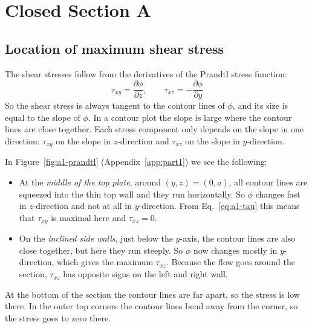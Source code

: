 \chapter{Closed Section A}
\label{ch:assignment1}

\bigskip

\section{Location of maximum shear stress}
\label{sec:a1-1}
The shear stresses follow from the derivatives of the Prandtl stress function:
\begin{equation}
    \tau_{xy} = \frac{\partial\phi}{\partial z},
    \qquad
    \tau_{xz} = -\frac{\partial\phi}{\partial y}
    \label{eq:a1-tau}
\end{equation}
So the shear stress is always tangent to the contour lines of $\phi$, and its size is equal to the slope of $\phi$. In a contour plot the slope is large where the contour lines are close together. Each stress component only depends on the slope in one direction: $\tau_{xy}$ on the slope in $z$-direction and $\tau_{xz}$ on the slope in $y$-direction.

In Figure~\ref{fig:a1-prandtl} (Appendix~\ref{app:part1}) we see the following:
\begin{itemize}
    \item At the \emph{middle of the top plate}, around $(y,z)=(0,a)$, all contour lines are squeezed into the thin top wall and they run horizontally. So $\phi$ changes fast in $z$-direction and not at all in $y$-direction. From Eq.~\eqref{eq:a1-tau} this means that $\tau_{xy}$ is maximal here and $\tau_{xz}=0$.
    \item On the \emph{inclined side walls}, just below the $y$-axis, the contour lines are also close together, but here they run steeply. So $\phi$ now changes mostly in $y$-direction, which gives the maximum $\tau_{xz}$. Because the flow goes around the section, $\tau_{xz}$ has opposite signs on the left and right wall.
\end{itemize}
At the bottom of the section the contour lines are far apart, so the stress is low there. In the outer top corners the contour lines bend away from the corner, so the stress goes to zero there.



